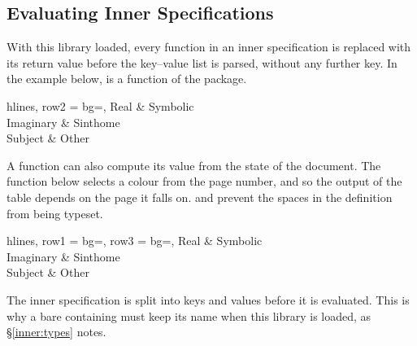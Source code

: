\subsection{Evaluating Inner Specifications}
With this library loaded, every function in an inner specification is replaced with its return value before the key--value list is parsed, without any further key. In the example below, \tsobj[code]{\funColor} is a function of the  package.

\begin{codestore}[st=lib:fun:color]
    \begin{tblr}{
            hlines,
            row{2} = {bg=},
        }
        Real      & Symbolic \\
        Imaginary & Sinthome \\
        Subject   & Other
    \end{tblr}\end{codestore}
\begin{center}
\end{center}

A function can also compute its value from the state of the document. The function below selects a colour from the page number, and so the output of the table depends on the page it falls on. \tsobj[code]{\IgnoreSpacesOn} and \tsobj[code]{\IgnoreSpacesOff} prevent the spaces in the definition from being typeset.

\begin{codestore}[st=lib:fun:page]
    \IgnoreSpacesOn
    \prgNewFunction {} {
        \intIfOddTF {\value{page}} {} {}
    }
    \IgnoreSpacesOff
    \begin{tblr}{
            hlines,
            row{1} = {bg=},
            row{3} = {bg=},
        }
        Real      & Symbolic \\
        Imaginary & Sinthome \\
        Subject   & Other
    \end{tblr}\end{codestore}
\begin{center}
\end{center}
\begin{tsremark}
    The inner specification is split into keys and values before it is evaluated. This is why a bare  containing \vrb{=} must keep its name when this library is loaded, as \S\ref{inner:types} notes.
\end{tsremark}

